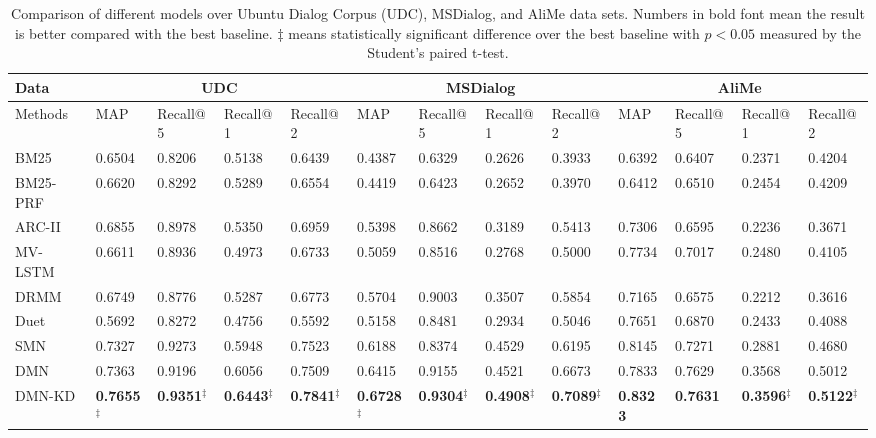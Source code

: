 \begin{table*}[]
	\footnotesize
	\centering
	\caption{Comparison of different models over Ubuntu Dialog Corpus (UDC), MSDialog, and AliMe data sets. 
		Numbers in bold font mean the result is better compared with the best baseline. 
		$\ddagger$ means statistically significant difference over the best baseline with $p < 0.05$ measured by the Student's paired t-test.} %
	\vspace{-0.1in}
	\label{tab:exp_res_udc_ms_ec}
	\begin{tabular}{l|l l l l | l l l l | l l l l}
		\hline \hline
		Data     & \multicolumn{4}{c|}{UDC}                & \multicolumn{4}{c|}{MSDialog}           & \multicolumn{4}{c}{AliMe}              \\ \hline
		Methods  & MAP    & Recall@5 & Recall@1 & Recall@2 & MAP    & Recall@5 & Recall@1 & Recall@2 & MAP    & Recall@5 & Recall@1 & Recall@2 \\ \hline \hline
		BM25     & 0.6504 & 0.8206   & 0.5138   & 0.6439   & 0.4387 & 0.6329   & 0.2626   & 0.3933   & 0.6392 & 0.6407   & 0.2371   & 0.4204   \\ \hline
		BM25-PRF & 0.6620 & 0.8292   & 0.5289   & 0.6554   & 0.4419 & 0.6423   & 0.2652   & 0.3970   & 0.6412 & 0.6510 & 0.2454         &  0.4209        \\ \hline
		ARC-II   & 0.6855 & 0.8978   & 0.5350   & 0.6959   & 0.5398 & 0.8662   & 0.3189   & 0.5413   & 0.7306 & 0.6595   & 0.2236   & 0.3671   \\ \hline
		MV-LSTM  & 0.6611 & 0.8936   & 0.4973   & 0.6733   & 0.5059 & 0.8516   & 0.2768   & 0.5000   & 0.7734 & 0.7017   & 0.2480   & 0.4105   \\ \hline
		DRMM     & 0.6749 & 0.8776   & 0.5287   & 0.6773   & 0.5704 & 0.9003   & 0.3507   & 0.5854   & 0.7165 & 0.6575   & 0.2212   & 0.3616   \\ \hline
		Duet     & 0.5692 & 0.8272   & 0.4756   & 0.5592   & 0.5158 & 0.8481   & 0.2934   & 0.5046   & 0.7651 & 0.6870   & 0.2433   & 0.4088   \\ \hline
		SMN      & 0.7327 & 0.9273   & 0.5948   & 0.7523   &  0.6188 & 0.8374 & 0.4529 & 0.6195 & 0.8145 & 0.7271   & 0.2881   & 0.4680   \\ \hline
		DMN      & 0.7363 & 0.9196   & 0.6056   & 0.7509   & 0.6415 & 0.9155   & 0.4521   & 0.6673   & 0.7833 & 0.7629   & 0.3568   & 0.5012   \\ \hline \hline
		DMN-KD   & \textbf{0.7655}$^\ddagger$ & \textbf{0.9351}$^\ddagger$   & \textbf{0.6443}$^\ddagger$   & \textbf{0.7841}$^\ddagger$   & \textbf{0.6728}$^\ddagger$ & \textbf{0.9304}$^\ddagger$   & \textbf{0.4908}$^\ddagger$   & \textbf{0.7089}$^\ddagger$   & \textbf{0.8323} & \textbf{0.7631}   & \textbf{0.3596}$^\ddagger$   & \textbf{0.5122}$^\ddagger$  \\ \hline

\end{tabular}
\end{table*}
